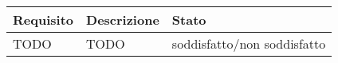 \begin{center}

	\def\arraystretch{1.5}
	\bgroup
	\begin{longtable}{| p{2.5cm} | p{8cm} | p{3.5cm} |}

		\hline
		\textbf{Requisito} & \textbf{Descrizione} & \textbf{Stato} \\
		\hline
		TODO & TODO & soddisfatto/non soddisfatto \\
		\hline
	\end{longtable}
	\egroup
\end{center}